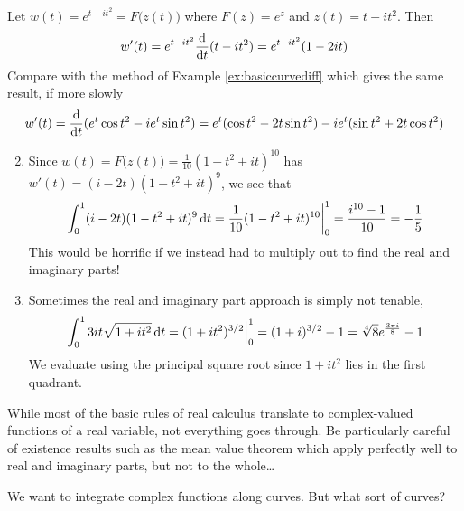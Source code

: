 \begin{examples}{}{}
	\exstart Let $w(t)=e^{t-it^2}=F\bigl(z(t)\bigr)$ where $F(z)=e^z$ and $z(t)=t-it^2$. Then
	\[
		w'(t) =e^{t-it^2}\frac{\mathrm{d} }{\mathrm{d} t}(t-it^2) =e^{t-it^2}(1-2it)
	\]
	Compare with the method of Example \ref{ex:basiccurvediff} which gives the same result, if more slowly
	\[
		w'(t) =\frac{\mathrm{d} }{\mathrm{d} t}(e^t\cos t^2-ie^t\sin t^2) =e^t(\cos t^2-2t\sin t^2)-ie^t(\sin t^2+2t\cos t^2)
	\]
	\begin{enumerate}\setcounter{enumi}{1}
		\item Since $w(t)=F\bigl(z(t)\bigr) =\frac 1{10}(1-t^2+it)^{10}$ has $w'(t)=(i-2t)(1-t^2+it)^9$, we see that
		\[
			\int_0^1(i-2t)(1-t^2+it)^9\,{\mathrm{d} t} =\frac 1{10}(1-t^2+it)^{10}\bigg|_0^1 =\frac{i^{10}-1}{10} =-\frac 15
		\]
		This would be horrific if we instead had to multiply out to find the real and imaginary parts!
		\item Sometimes the real and imaginary part approach is simply not tenable,
		\[
			\int_0^1 3it\sqrt{1+it^2}\,{\mathrm{d} t} =(1+it^2)^{3/2}\Big|_0^1 =(1+i)^{3/2}-1 =\sqrt[4] 8e^{\frac{3\pi i}{8}}-1
		\]
		We evaluate using the principal square root since $1+it^2$ lies in the first quadrant.
	\end{enumerate}
\end{examples}
\goodbreak

While most of the basic rules of real calculus translate to complex-valued functions of a real variable, not everything goes through. Be particularly careful of existence results such as the mean value theorem which apply perfectly well to real and imaginary parts, but not to the whole\ldots
\goodbreak



We want to integrate complex functions along curves. But what sort of curves?

